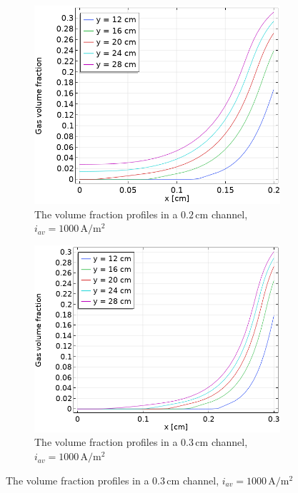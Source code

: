 \begin{figure}[H]
\centering
\begin{subfigure}{.5\textwidth}
  \centering
  \includegraphics[width=1\linewidth]{volumefraction2mm1000Anosaff.png}
  \caption{The volume fraction profiles in a $0.2 \, \mathrm{cm}$ channel, $i_{av}=1000 \, \mathrm{A/m^2}$}
\end{subfigure}%
\begin{subfigure}{.5\textwidth}
  \centering
  \includegraphics[width=1\linewidth]{volumefraction3mm1000Anosaff.png}
  \caption{The volume fraction profiles in a $0.3 \, \mathrm{cm}$ channel, $i_{av}=1000 \, \mathrm{A/m^2}$}

\end{subfigure}
\end{figure}
